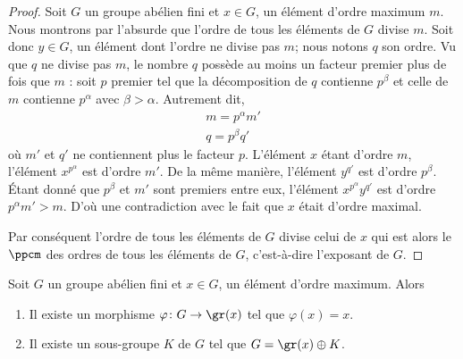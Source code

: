 \begin{proof}
    Soit \( G\) un groupe abélien fini et \( x\in G\), un élément d'ordre maximum \( m\). Nous montrons par l'absurde que l'ordre de tous les éléments de \( G\) divise \( m\). Soit donc \( y\in G\), un élément dont l'ordre ne divise pas \( m\); nous notons $q$ son ordre. Vu que \( q\) ne divise pas \( m\), le nombre \( q\) possède au moins un facteur premier plus de fois que \( m\) : soit \( p\) premier tel que la décomposition de \( q\) contienne \( p^{\beta}\) et celle de \( m\) contienne \( p^{\alpha}\) avec \( \beta>\alpha\). Autrement dit,
    \begin{subequations}
        \begin{align}
            m=p^{\alpha}m'\\
            q=p^{\beta}q'
        \end{align}
    \end{subequations}
    où \( m'\) et \( q'\) ne contiennent plus le facteur \( p\). L'élément \( x\) étant d'ordre \( m\), l'élément \( x^{p^{\alpha}}\) est d'ordre \( m'\). De la même manière, l'élément \( y^{q'}\) est d'ordre \( p^{\beta}\). Étant donné que \( p^{\beta}\) et \( m'\) sont premiers entre eux, l'élément  \( x^{p^{\alpha}}y^{q'}\) est d'ordre \( p^{\alpha}m'>m\). D'où une contradiction avec le fait que \( x\) était d'ordre maximal.

    Par conséquent l'ordre de tous les éléments de $G$ divise celui de \( x\) qui est alors le \( \ppcm\) des ordres de tous les éléments de \( G\), c'est-à-dire l'exposant de \( G\).
\end{proof}

\begin{proposition} \label{PropfPRVxi}
    Soit \( G\) un groupe abélien fini et \( x\in G\), un élément d'ordre maximum. Alors
    \begin{enumerate}
        \item
            Il existe un morphisme \( \varphi\colon G\to \gr(x)\) tel que \( \varphi(x)=x\).
        \item   \label{ItemKRYwjU}
            Il existe un sous-groupe \( K\) de \( G\) tel que \( G=\gr(x)\oplus K\).
    \end{enumerate}
\end{proposition}

